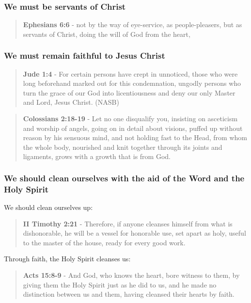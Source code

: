 \documentclass[11pt]{article}
\begin{document}
\subsubsection{We must be servants of Christ}
\label{sec:org95fdce0}

\begin{quote}
\textbf{Ephesians 6:6} - not by the way of eye-service, as people-pleasers, but as servants of Christ, doing the will of God from the heart,
\end{quote}

\subsubsection{We must remain faithful to Jesus Christ}
\label{sec:orgcdfb84c}

\begin{quote}
\textbf{Jude 1:4} - For certain persons have crept in unnoticed, those who were long beforehand marked out for this condemnation, ungodly persons who turn the grace of our God into licentiousness and deny our only Master and Lord, Jesus Christ. (NASB)
\end{quote}

\begin{quote}
\textbf{Colossians 2:18-19} - Let no one disqualify you, insisting on asceticism and worship of angels, going on in detail about visions, puffed up without reason by his sensuous mind, and not holding fast to the Head, from whom the whole body, nourished and knit together through its joints and ligaments, grows with a growth that is from God.
\end{quote}

\subsubsection{We should clean ourselves with the aid of the Word and the Holy Spirit}
\label{sec:org80f4210}
We should clean ourselves up:

\begin{quote}
\textbf{II Timothy 2:21} - Therefore, if anyone cleanses himself from what is dishonorable, he will be a vessel for honorable use, set apart as holy, useful to the master of the house, ready for every good work.
\end{quote}

Through faith, the Holy Spirit cleanses us:

\begin{quote}
\textbf{Acts 15:8-9} - And God, who knows the heart, bore witness to them, by giving them the Holy Spirit just as he did to us, and he made no distinction between us and them, having cleansed their hearts by faith.
\end{quote}
\end{document}

